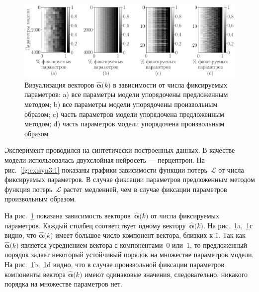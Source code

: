 \begin{figure}[h!t]\center
\includegraphics[width=1\textwidth]{results/order/generate_data_neural_matshow}
\caption{Визуализация векторов $\hat{\bm{\alpha}}\bigr(k\bigr)$ в зависимости от числа фиксируемых параметров: a) все параметры модели упорядочены предложенным методом; b) все параметры модели упорядочены произвольным образом; c) часть параметров модели упорядочена предложенным методом; d) часть параметров модели упорядочена произвольным образом}
\label{fg:ex:syn3:2}
\end{figure}

Эксперимент проводился на синтетически построенных данных. В качестве модели использовалась двухслойная нейросеть --- перцептрон.
На рис.~\ref{fg:ex:syn3:1} показаны графики зависимости функции потерь~$\mathcal{L}$ от числа фиксируемых параметров. В случае фиксации параметров предложенным методом функция потерь~$\mathcal{L}$ растет медленней, чем в случае фиксации параметров произвольным образом.

На рис.~\ref{fg:ex:syn3:2} показана зависимость векторов~$\hat{\bm{\alpha}}\bigr(k\bigr)$ от числа фиксируемых параметров. Каждый столбец соответствует одному вектору~$\hat{\bm{\alpha}}\bigr(k\bigr)$. На рис.~\ref{fg:ex:syn3:2}a,~\ref{fg:ex:syn3:2}с видно, что $\hat{\bm{\alpha}}\bigr(k\bigr)$ имеет большое число компонент вектора, близких к $1$. Так как~$\hat{\bm{\alpha}}\bigr(k\bigr)$ является усреднением вектора с компонентами~$0$ или~$1$, то предложенный порядок задает некоторый устойчивый порядок на множестве параметров модели. На рис.~\ref{fg:ex:syn3:2}b,~\ref{fg:ex:syn3:2}d видно, что в случае произвольной фиксации параметров компоненты вектора $\hat{\bm{\alpha}}\bigr(k\bigr)$ имеют одинаковые значения, следовательно, никакого порядка на множестве параметров нет.

